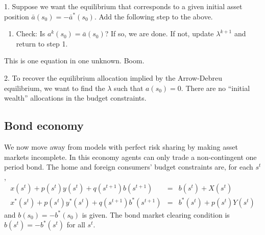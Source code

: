 \documentclass[11pt,pdftex,twoside,letterpaper]{exam}
\begin{document}
1. Suppose we want the equilibrium that corresponds to a given initial asset position $\bar{a}(s_0)=-\bar{a}^*(s_0)$. Add the following step to the above.
\begin{enumerate}[resume]
  \item Check: Is $a^k(s_0) = \bar{a}(s_0)$? If so, we are done. If not, update $\lambda^{k+1}$ and return to step 1.
\end{enumerate}
This is one equation in one unknown. Boom.

2. To recover the equilibrium allocation implied by the Arrow-Debreu equilibrium, we want to find the $\lambda$ such that $a(s_0)=0$. There are no ``initial wealth'' allocations in the budget constraints.

\subsection{Bond economy}
We now move away from models with perfect risk sharing by making asset markets incomplete. In this economy agents can only trade a non-contingent one period bond. The home and foreign consumers' budget constraints are, for each $s^t$,
\begin{eqnarray}
  x(s^t) + p(s^t)y(s^t) + q(s^{t+1})b(s^{t+1})&=&b(s^t) + X(s^t)\\
  x^*(s^t) + p(s^t)y^*(s^t) + q(s^{t+1})b^*(s^{t+1})&=&b^*(s^t) + p(s^t)Y(s^t)
\end{eqnarray}
and $b(s_0)=-b^*(s_0)$ is given. The bond market clearing condition is $b(s^t)=-b^*(s^t)$ for all $s^t$.
\end{document}
